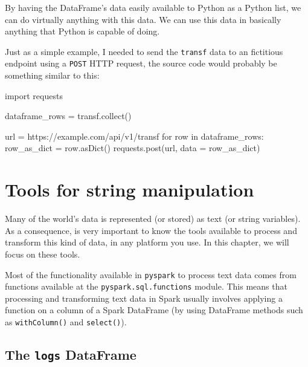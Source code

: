 \documentclass[
  11pt,
  letterpaper,
  DIV=11,
  numbers=noendperiod]{scrreprt}
\newenvironment{Shaded}{\begin{snugshade}}{\end{snugshade}}
\newcommand{\ControlFlowTok}[1]{\textcolor[rgb]{0.00,0.23,0.31}{#1}}
\newcommand{\ImportTok}[1]{\textcolor[rgb]{0.00,0.46,0.62}{#1}}
\newcommand{\KeywordTok}[1]{\textcolor[rgb]{0.00,0.23,0.31}{#1}}
\newcommand{\NormalTok}[1]{\textcolor[rgb]{0.00,0.23,0.31}{#1}}
\newcommand{\OperatorTok}[1]{\textcolor[rgb]{0.37,0.37,0.37}{#1}}
\newcommand{\StringTok}[1]{\textcolor[rgb]{0.13,0.47,0.30}{#1}}
\begin{document}
By having the DataFrame's data easily available to Python as a Python
list, we can do virtually anything with this data. We can use this data
in basically anything that Python is capable of doing.

Just as a simple example, I needed to send the \texttt{transf} data to
an fictitious endpoint using a \texttt{POST} HTTP request, the source
code would probably be something similar to this:

\begin{Shaded}
\begin{Highlighting}[]
\ImportTok{import}\NormalTok{ requests}

\NormalTok{dataframe\_rows }\OperatorTok{=}\NormalTok{ transf.collect()}

\NormalTok{url }\OperatorTok{=} \StringTok{\textquotesingle{}https://example.com/api/v1/transf\textquotesingle{}}
\ControlFlowTok{for}\NormalTok{ row }\KeywordTok{in}\NormalTok{ dataframe\_rows:}
\NormalTok{    row\_as\_dict }\OperatorTok{=}\NormalTok{ row.asDict()}
\NormalTok{    requests.post(url, data }\OperatorTok{=}\NormalTok{ row\_as\_dict)}
\end{Highlighting}
\end{Shaded}


\hypertarget{sec-string-tools}{%
\chapter{Tools for string manipulation}\label{sec-string-tools}}

Many of the world's data is represented (or stored) as text (or string
variables). As a consequence, is very important to know the tools
available to process and transform this kind of data, in any platform
you use. In this chapter, we will focus on these tools.

Most of the functionality available in \texttt{pyspark} to process text
data comes from functions available at the
\texttt{pyspark.sql.functions} module. This means that processing and
transforming text data in Spark usually involves applying a function on
a column of a Spark DataFrame (by using DataFrame methods such as
\texttt{withColumn()} and \texttt{select()}).

\hypertarget{the-logs-dataframe}{%
\section{\texorpdfstring{The \texttt{logs}
DataFrame}{The logs DataFrame}}\label{the-logs-dataframe}}
\end{document}
